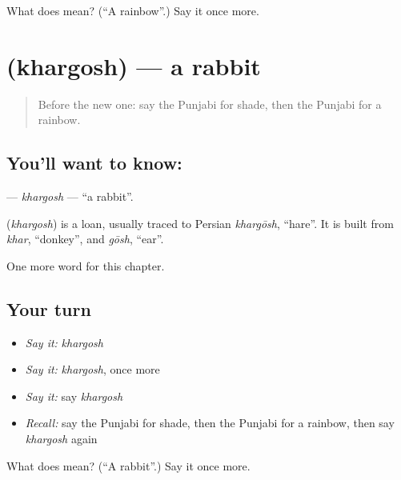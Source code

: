 \begin{tcolorbox}[breakable,colback=teal!4,colframe=teal!35!black,title={Before you move on}]
What does   mean? (\textquotedblleft{}A rainbow\textquotedblright{}.) Say it once more.
\end{tcolorbox}
\section[\texorpdfstring{\pa{ਖ਼ਰਗੋਸ਼} (khargosh)}{ਖ਼ਰਗੋਸ਼ (khargosh)}]{ (khargosh) — a rabbit}

\label{lesson:PA-C129-khargosh}



\begin{quote}
Before the new one: say the Punjabi for shade, then the Punjabi for a rainbow.
\end{quote}

\subsection*{You'll want to know: }
\textbf{} — \emph{khargosh} — \textquotedblleft{}a rabbit\textquotedblright{}.

\begin{cousinweb}
\textbf{} (\emph{khargosh}) is a loan, usually traced to Persian \emph{khargōsh}, \textquotedblleft{}hare\textquotedblright{}. It is built from \emph{khar}, \textquotedblleft{}donkey\textquotedblright{}, and \emph{gōsh}, \textquotedblleft{}ear\textquotedblright{}.
\end{cousinweb}

\begin{grammarlens}[title={What you've built}]
One more word for this chapter.
\end{grammarlens}

\subsection*{Your turn}
\begin{itemize}
\raggedright
  \item \emph{Say it:} \emph{khargosh}
  \item \emph{Say it:} \emph{khargosh}, once more
  \item \emph{Say it:} say \emph{khargosh}
  \item \emph{Recall:} say the Punjabi for shade, then the Punjabi for a rainbow, then say \emph{khargosh} again
\end{itemize}

\begin{tcolorbox}[breakable,colback=teal!4,colframe=teal!35!black,title={Before you move on}]
What does  mean? (\textquotedblleft{}A rabbit\textquotedblright{}.) Say it once more.
\end{tcolorbox}
